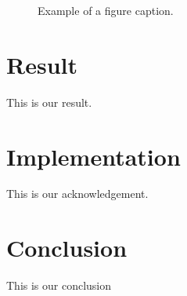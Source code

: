 \documentclass[conference]{IEEEtran}
\begin{document}
\begin{figure}[htbp]
\centerline{
}
\caption{Example of a figure caption.}
\label{fig}
\end{figure}

\section*{Result}

This is our result.

\section*{Implementation}

This is our acknowledgement.

\section*{Conclusion}

This is our conclusion
\end{document}
